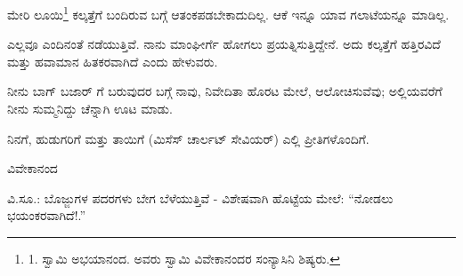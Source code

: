 ಮೇರಿ ಲೂಯಿ\footnote{1. ಸ್ವಾಮಿ ಅಭಯಾನಂದ. ಅವರು ಸ್ವಾಮಿ ವಿವೇಕಾನಂದರ ಸಂನ್ಯಾಸಿನಿ ಶಿಷ್ಯರು.} ಕಲ್ಕತ್ತೆಗೆ ಬಂದಿರುವ ಬಗ್ಗೆ ಆತಂಕಪಡಬೇಕಾದುದಿಲ್ಲ. ಆಕೆ ಇನ್ನೂ ಯಾವ ಗಲಾಟೆಯನ್ನೂ ಮಾಡಿಲ್ಲ.

ಎಲ್ಲವೂ ಎಂದಿನಂತೆ ನಡೆಯುತ್ತಿವೆ. ನಾನು ಮಾಂಘೀರ್ಗೆ ಹೋಗಲು ಪ್ರಯತ್ನಿಸುತ್ತಿದ್ದೇನೆ. ಅದು ಕಲ್ಕತ್ತೆಗೆ ಹತ್ತಿರವಿದೆ ಮತ್ತು ಹವಾಮಾನ ಹಿತಕರವಾಗಿದೆ ಎಂದು ಹೇಳುವರು.

ನೀನು ಬಾಗ್ ಬಜಾರ್ ಗೆ ಬರುವುದರ ಬಗ್ಗೆ ನಾವು, ನಿವೇದಿತಾ ಹೊರಟ ಮೇಲೆ, ಆಲೋಚಿಸುವೆವು; ಅಲ್ಲಿಯವರೆಗೆ ನೀನು ಸುಮ್ಮನಿದ್ದು ಚೆನ್ನಾಗಿ ಊಟ ಮಾಡು.

ನಿನಗೆ, ಹುಡುಗರಿಗೆ ಮತ್ತು ತಾಯಿಗೆ (ಮಿಸೆಸ್ ಚಾರ್ಲಟ್ ಸೇವಿಯರ್) ಎಲ್ಲಿ ಪ್ರೀತಿಗಳೊಂದಿಗೆ.

\begin{flushright}
ವಿವೇಕಾನಂದ
\end{flushright}

ವಿ.ಸೂ.: ಬೊಜ್ಜುಗಳ ಪದರಗಳು ಬೇಗ ಬೆಳೆಯುತ್ತಿವೆ - ವಿಶೇಷವಾಗಿ ಹೊಟ್ಟೆಯ ಮೇಲೆ: “ನೋಡಲು ಭಯಂಕರವಾಗಿದೆ!.”

